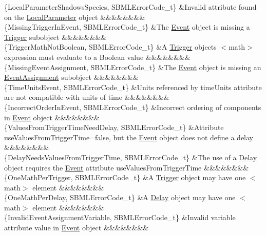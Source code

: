 \begin{DoxyParagraph}{}
\begin{longtabu}
\{Local\+Parameter\+Shadows\+Species, S\+B\+M\+L\+Error\+Code\+\_\+t\} &Invalid attribute found on the \hyperlink{class_local_parameter}{Local\+Parameter} object &&&&&&&&\\
\{Missing\+Trigger\+In\+Event, S\+B\+M\+L\+Error\+Code\+\_\+t\} &The \hyperlink{class_event}{Event} object is missing a \hyperlink{class_trigger}{Trigger} subobject &&&&&&&&\\
\{Trigger\+Math\+Not\+Boolean, S\+B\+M\+L\+Error\+Code\+\_\+t\} &A \hyperlink{class_trigger}{Trigger} object\textquotesingle{}s {\ttfamily $<$math$>$} expression must evaluate to a Boolean value &&&&&&&&\\
\{Missing\+Event\+Assignment, S\+B\+M\+L\+Error\+Code\+\_\+t\} &The \hyperlink{class_event}{Event} object is missing an \hyperlink{class_event_assignment}{Event\+Assignment} subobject &&&&&&&&\\
\{Time\+Units\+Event, S\+B\+M\+L\+Error\+Code\+\_\+t\} &Units referenced by \textquotesingle{}time\+Units\textquotesingle{} attribute are not compatible with units of time &&&&&&&&\\
\{Incorrect\+Order\+In\+Event, S\+B\+M\+L\+Error\+Code\+\_\+t\} &Incorrect ordering of components in \hyperlink{class_event}{Event} object &&&&&&&&\\
\{Values\+From\+Trigger\+Time\+Need\+Delay, S\+B\+M\+L\+Error\+Code\+\_\+t\} &Attribute \textquotesingle{}use\+Values\+From\+Trigger\+Time\textquotesingle{}=\textquotesingle{}false\textquotesingle{}, but the \hyperlink{class_event}{Event} object does not define a delay &&&&&&&&\\
\{Delay\+Needs\+Values\+From\+Trigger\+Time, S\+B\+M\+L\+Error\+Code\+\_\+t\} &The use of a \hyperlink{class_delay}{Delay} object requires the \hyperlink{class_event}{Event} attribute \textquotesingle{}use\+Values\+From\+Trigger\+Time\textquotesingle{} &&&&&&&&\\
\{One\+Math\+Per\+Trigger, S\+B\+M\+L\+Error\+Code\+\_\+t\} &A \hyperlink{class_trigger}{Trigger} object may have one {\ttfamily $<$math$>$} element &&&&&&&&\\
\{One\+Math\+Per\+Delay, S\+B\+M\+L\+Error\+Code\+\_\+t\} &A \hyperlink{class_delay}{Delay} object may have one {\ttfamily $<$math$>$} element &&&&&&&&\\
\{Invalid\+Event\+Assignment\+Variable, S\+B\+M\+L\+Error\+Code\+\_\+t\} &Invalid \textquotesingle{}variable\textquotesingle{} attribute value in \hyperlink{class_event}{Event} object &&&&&&&&\\

\end{longtabu}
\end{DoxyParagraph}
